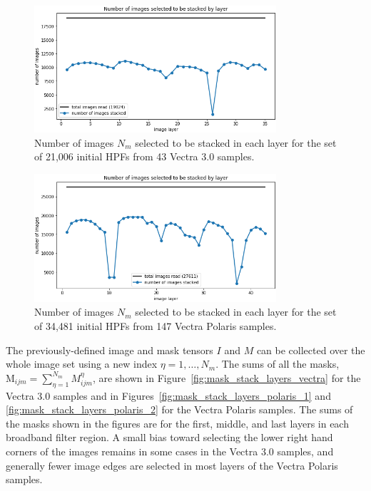 \documentclass[letterpaper,11pt]{article}
\newcommand{\reffig}[1]{Figure~\ref{#1}}
\newcommand{\Mu}{\mathrm{M}}
\begin{document}
\begin{figure}[!ht]
\centering
\includegraphics[width=0.8\textwidth]{images/measuring_flatfield_corrections/n_images_stacked_per_layer_vectra}
\caption{\footnotesize Number of images $N_{m}$ selected to be stacked in each layer for the set of 21,006 initial HPFs from 43 Vectra 3.0 samples.}
\label{fig:n_images_stacked_by_layer_vectra}
\end{figure}

\begin{figure}[!ht]
\centering
\includegraphics[width=0.8\textwidth]{images/measuring_flatfield_corrections/n_images_stacked_per_layer_polaris}
\caption{\footnotesize Number of images $N_{m}$ selected to be stacked in each layer for the set of 34,481 initial HPFs from 147 Vectra Polaris samples.}
\label{fig:n_images_stacked_by_layer_polaris}
\end{figure}

The previously-defined image and mask tensors $I$ and $M$ can be collected over the whole image set using a new index $\eta=1,\ldots,N_{m}$. The sums of all the masks, $\Mu_{ijm} = \sum_{\eta=1}^{N_{m}} M^{\eta}_{ijm}$, are shown in \reffig{fig:mask_stack_layers_vectra} for the Vectra 3.0 samples and in Figures~\ref{fig:mask_stack_layers_polaris_1} and \ref{fig:mask_stack_layers_polaris_2} for the Vectra Polaris samples. The sums of the masks shown in the figures are for the first, middle, and last layers in each broadband filter region. A small bias toward selecting the lower right hand corners of the images remains in some cases in the Vectra 3.0 samples, and generally fewer image edges are selected in most layers of the Vectra Polaris samples. 
\end{document}

